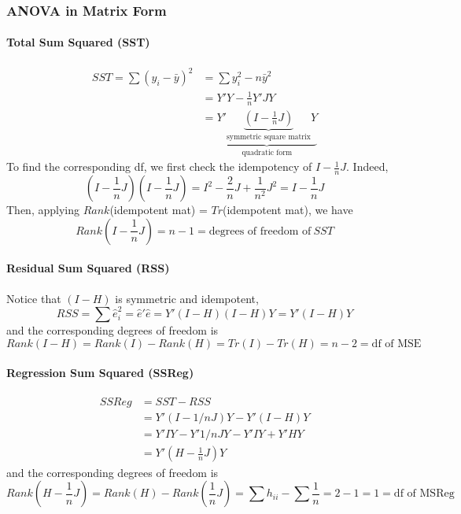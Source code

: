 \documentclass[11pt]{article}
\begin{document}
\subsubsection{ANOVA in Matrix Form}
\paragraph{Total Sum Squared (SST)}
\begin{align*}
    SST = \sum\left(y_{i}-\bar{y}\right)^{2} &=\sum y_{i}^{2}-n \bar{y}^{2} \\
    &= Y'Y - \frac{1}{n}Y'J Y \\
    &= \underbrace{Y'\underbrace{(I - \frac{1}{n}J)}_{\text{symmetric square matrix}} Y}_{\text{quadratic form}}
\end{align*}
To find the corresponding df, we first check the idempotency of $I - \frac{1}{n}J$. Indeed,
\begin{equation*}
    (I - \frac{1}{n}J)(I - \frac{1}{n}J) = I^2 - \frac{2}{n}J + \frac{1}{n^2}J^2 = I - \frac{1}{n}J
\end{equation*}
Then, applying $Rank$(idempotent mat) = $Tr$(idempotent mat), we have
\begin{equation*}
    Rank(I - \frac{1}{n}J) = n - 1 = \text{degrees of freedom of} ~SST
\end{equation*}

\paragraph{Residual Sum Squared (RSS)}
Notice that $(I - H)$ is symmetric and idempotent,
\begin{equation*}
    R S S=\sum \hat{e}_{i}^{2} = \hat{e}' \hat{e} = Y'(I - H)(I - H)Y = Y'(I - H)Y
\end{equation*}
and the corresponding degrees of freedom is
\begin{equation*}
    Rank(I - H) = Rank(I) - Rank(H) = Tr(I) - Tr(H) = n-2 = \text{df of MSE}
\end{equation*}

\paragraph{Regression Sum Squared (SSReg)}
\begin{align*}
    SSReg &= SST - RSS \\
    &= Y'(I - 1/n J)Y - Y'(I - H)Y \\
    &= Y'IY - Y' 1/n JY - Y'IY + Y'HY \\
    &= Y'(H - \frac{1}{n}J) Y
\end{align*}
and the corresponding degrees of freedom is
\begin{equation*}
    Rank(H - \frac{1}{n}J) = Rank(H) - Rank(\frac{1}{n}J) = \sum h_{ii} - \sum \frac{1}{n} = 2 - 1 = 1 = \text{df of MSReg}
\end{equation*}
\end{document}
